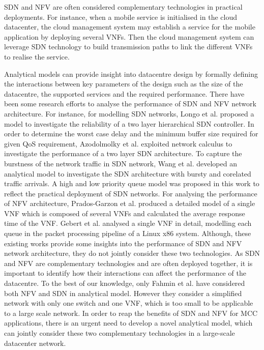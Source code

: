 SDN and NFV are often considered complementary technologies \cite{MatiasGTUJ15} in practical deployments. For instance, when a mobile service is initialised in the cloud datacenter, the cloud management system may establish a service for the mobile application by deploying several VNFs. Then the cloud management system can leverage SDN technology to build transmission paths to link the different VNFs to realise the service. 

Analytical models can provide insight into datacentre design by formally defining the interactions between key parameters of the design such as the size of the datacentre, the supported services and the required performance. There have been some research efforts to analyse the performance of SDN and NFV network architecture. For instance, for modelling SDN networks, Longo et al. \cite{LongoDBS15} proposed a model to investigate the reliability of a two layer hierarchical SDN controller. In order to determine the worst case delay and the minimum buffer size required for given QoS requirement, Azodolmolky et al. \cite{AzodolmolkyWY13} exploited network calculus to investigate the performance of a two layer SDN architecture. To capture the burstness of the network traffic in SDN network, Wang et al. \cite{MiaoMWWH16} developed an analytical model to investigate the SDN architecture with bursty and corelated traffic arrivals. A high and low priority queue model was proposed in this work to reflect the practical deployment of SDN networks. For analysing the performance of NFV architecture, Prados-Garzon et al. \cite{Prados-GarzonAR17} produced a detailed model of a single VNF which is composed of several VNFs and calculated the average response time of the VNF. Gebert et al. \cite{GebertZLST16} analysed a single VNF in detail, modelling each queue in the packet processing pipeline of a Linux x86 system. Although, these existing works provide some insights into the performance of SDN and NFV network architecture, they do not jointly consider these two technologies. As SDN and NFV are complementary technologies and are often deployed together, it is important to identify how their interactions can affect the performance of the datacentre. To the best of our knowledge, only Fahmin et al. \cite{FahminLHLS17} have considered both NFV and SDN in analytical model. However they consider a simplified network with only one switch and one VNF, which is too small to be applicable to a large scale network. In order to reap the benefits of SDN and NFV for MCC applications, there is an urgent need to develop a novel analytical model, which can jointly consider these two complementary technologies in a large-scale datacenter network. 

